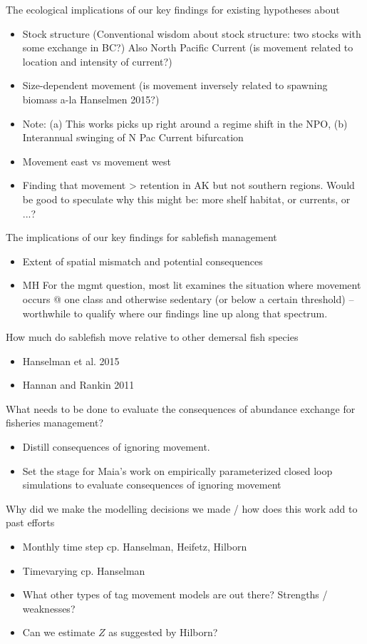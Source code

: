 \documentclass{article}
\begin{document}
\noindent The ecological implications of our key findings for existing hypotheses about
\begin{itemize}
\item Stock structure (Conventional wisdom about stock structure: two stocks with some exchange in BC?) Also North Pacific Current (is movement related to location and intensity of current?)
\item Size-dependent movement (is movement inversely related to spawning biomass a-la Hanselmen 2015?)
\item Note: (a) This works picks up right around a regime shift in the NPO, (b) Interannual swinging of N Pac Current bifurcation
\item Movement east vs movement west
\item Finding that movement > retention in AK but not southern regions. Would be good to speculate why this might be: more shelf habitat, or currents, or ...?
\end{itemize}


\noindent The implications of our key findings for sablefish management
\begin{itemize}
\item Extent of spatial mismatch and potential consequences
\item MH For the mgmt question, most lit examines the situation where movement occurs @ one class and otherwise sedentary (or below a certain threshold) -- worthwhile to qualify where our findings line up along that spectrum.
\end{itemize}

\noindent How much do sablefish move relative to other demersal fish species
\begin{itemize}
\item Hanselman et al. 2015 
\item Hannan and Rankin 2011
\end{itemize}

\noindent What needs to be done to evaluate the consequences of abundance exchange for fisheries management?
\begin{itemize}
\item Distill consequences of ignoring movement.
\item Set the stage for Maia's work on empirically parameterized closed loop simulations to evaluate consequences of ignoring movement
\end{itemize}

\noindent Why did we make the modelling decisions we made / how does this work add to past efforts
\begin{itemize}
\item Monthly time step cp. Hanselman, Heifetz, Hilborn
\item Timevarying cp. Hanselman
\item What other types of tag movement models are out there? Strengths / weaknesses?
\item Can we estimate $Z$ as suggested by Hilborn?
\end{itemize}
\end{document}
